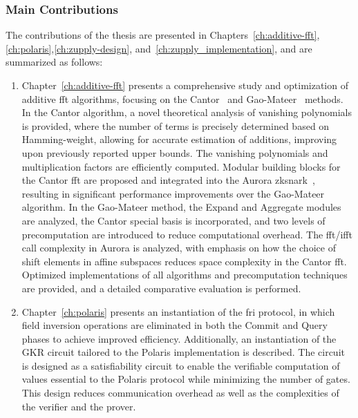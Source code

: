 \subsubsection{Main Contributions}
 The contributions of the thesis are presented in Chapters~\ref{ch:additive-fft},\ref{ch:polaris},\ref{ch:zupply-design}, and~\ref{ch:zupply_implementation}, and are summarized as follows:
\begin{enumerate}
\item Chapter~\ref{ch:additive-fft} presents a comprehensive study and optimization of additive \gls{fft} algorithms, focusing on the Cantor~\cite{Cantor1989FFT} and Gao-Mateer~\cite{Gao2010FFT} methods. In the Cantor algorithm, a novel theoretical analysis of vanishing polynomials is provided, where the number of terms is precisely determined based on Hamming-weight, allowing for accurate estimation of additions, improving upon previously reported upper bounds. The vanishing polynomials and multiplication factors are efficiently computed. Modular building blocks for the Cantor \gls{fft} are proposed and integrated into the Aurora \gls{zksnark}~\cite{libiop}, resulting in significant performance improvements over the Gao-Mateer algorithm. In the Gao-Mateer method, the \textsf{Expand} and \textsf{Aggregate} modules are analyzed, the Cantor special basis is incorporated, and two levels of precomputation are introduced to reduce computational overhead. The \gls{fft}/\gls{ifft} call complexity in Aurora is analyzed, with emphasis on how the choice of shift elements in affine subspaces reduces space complexity in the Cantor \gls{fft}. Optimized \CC implementations of all algorithms and precomputation techniques are provided, and a detailed comparative evaluation is performed.

\item Chapter~\ref{ch:polaris} presents an instantiation of the \gls{fri} protocol, in which field inversion operations are eliminated in both the Commit and Query phases to achieve improved efficiency. Additionally, an instantiation of the GKR circuit tailored to the Polaris implementation is described. The circuit is designed as a satisfiability circuit to enable the verifiable computation of values essential to the Polaris protocol while minimizing the number of gates. This design reduces communication overhead as well as the complexities of the verifier and the prover.


\end{enumerate}
